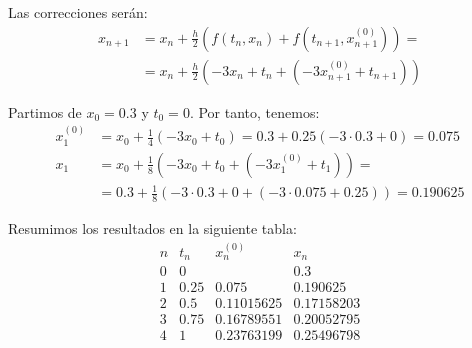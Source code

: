 \begin{ejercicio}
\begin{enumerate}
            Las correcciones serán:
            \begin{align*}
                x_{n+1} &= x_n + \frac{h}{2} \left( f(t_n, x_n) + f(t_{n+1}, x_{n+1}^{(0)}) \right)
                =\\&= x_n + \frac{h}{2} \left( -3x_n + t_n + (-3x_{n+1}^{(0)} + t_{n+1}) \right)
            \end{align*}

            Partimos de $x_0=0.3$ y $t_0 = 0$. Por tanto, tenemos:
            \begin{align*}
                x_1^{(0)} &= x_0 + \frac{1}{4}(-3x_0 + t_0) = 0.3 + 0.25(-3\cdot 0.3 + 0) = 0.075 \\
                x_1 &= x_0 + \frac{1}{8} \left( -3x_0 + t_0 + (-3x_1^{(0)} + t_1) \right) =\\&= 0.3 + \frac{1}{8} \left( -3\cdot 0.3 + 0 + (-3\cdot 0.075 + 0.25) \right) = 0.190625
            \end{align*}

            Resumimos los resultados en la siguiente tabla:
            \begin{equation*}
                \begin{array}{c|c|c|c}
                    n & t_n & x_n^{(0)} & x_n \\
                    \hline
                    0 & 0 & & 0.3 \\
                    1 & 0.25 & 0.075 & 0.190625 \\
                    2 & 0.5 & 0.11015625 & 0.17158203 \\
                    3 & 0.75 & 0.16789551 & 0.20052795 \\
                    4 & 1 & 0.23763199 & 0.25496798
                \end{array}
            \end{equation*}
    \end{enumerate}
\end{ejercicio}

